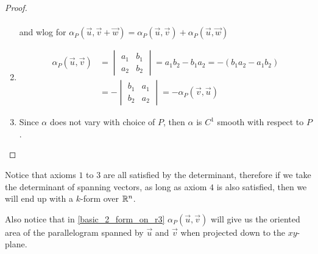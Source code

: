 \documentclass[notes]{subfiles}
\begin{document}
\begin{proof}
\begin{enumerate}[label = (\arabic*)]
\begin{align*}
        \end{align*}
        and wlog for $\alpha_P(\vec{u}, \vec{v} + \vec{w}) = \alpha_P(\vec{u}, \vec{v}) + \alpha_P(\vec{u}, \vec{w})$
        \item \begin{align*}
            \alpha_P(\vec{u}, \vec{v})
            &= \begin{vmatrix}
                a_1 & b_1 \\
                a_2 & b_2
            \end{vmatrix}
            = a_1b_2 - b_1a_2
            = -(b_1a_2 - a_1b_2) \\
            &= -\begin{vmatrix}
                b_1 & a_1 \\
                b_2 & a_2
            \end{vmatrix}
            = -\alpha_P(\vec{v}, \vec{u})
        \end{align*}
        \item Since $\alpha$ does not vary with choice of $P$, then $\alpha$ is $C^1$ smooth with respect to $P$.
    \end{enumerate}
\end{proof}

Notice that axioms $1$ to $3$ are all satisfied by the determinant, therefore if we take the determinant of spanning vectors, as long as axiom $4$ is also satisfied, then we will end up with a $k$-form over $\mathbb{R}^n$.

Also notice that in \cref{basic_2_form_on_r3} $\alpha_P(\vec{u}, \vec{v})$ will give us the oriented area of the parallelogram spanned by $\vec{u}$ and $\vec{v}$ when projected down to the $xy$-plane.
\end{document}
